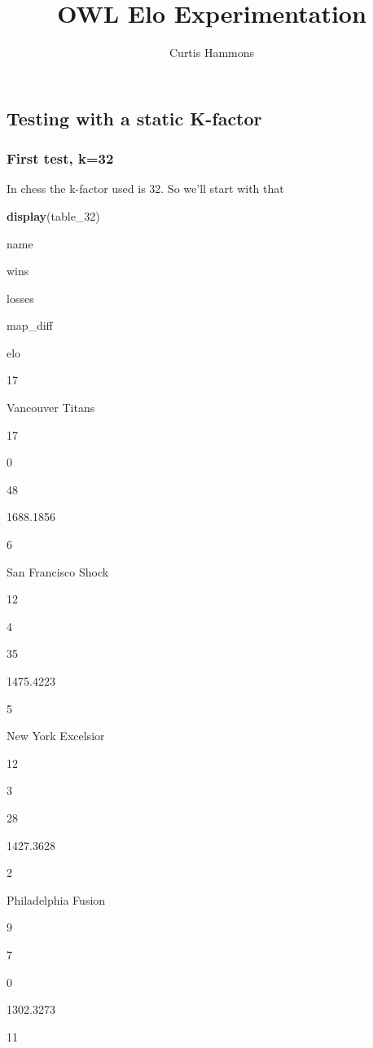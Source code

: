 \documentclass[]{article}
\title{OWL Elo Experimentation}
\author{Curtis Hammons}
\date{}
\newenvironment{Shaded}{\begin{snugshade}}{\end{snugshade}}
\newcommand{\KeywordTok}[1]{\textcolor[rgb]{0.13,0.29,0.53}{\textbf{#1}}}
\newcommand{\DecValTok}[1]{\textcolor[rgb]{0.00,0.00,0.81}{#1}}
\newcommand{\NormalTok}[1]{#1}
\begin{document}
\maketitle

\subsection{Testing with a static
K-factor}\label{testing-with-a-static-k-factor}

\subsubsection{First test, k=32}\label{first-test-k32}

In chess the k-factor used is 32. So we'll start with that

\begin{Shaded}
\begin{Highlighting}[]
\KeywordTok{display}\NormalTok{(table_}\DecValTok{32}\NormalTok{)}
\end{Highlighting}
\end{Shaded}

name

wins

losses

map\_diff

elo

17

Vancouver Titans

17

0

{48}

{1688.1856}

6

San Francisco Shock

12

4

{35}

{1475.4223}

5

New York Excelsior

12

3

{28}

{1427.3628}

2

Philadelphia Fusion

9

7

{0}

{1302.3273}

11
\end{document}

